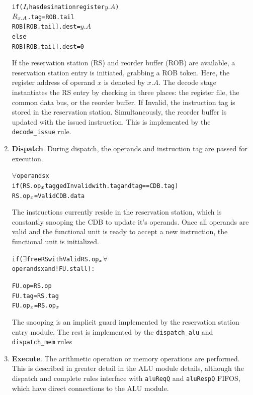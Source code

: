 \documentclass[12pt]{article}
\newcommand{\mtt}[1]{\(#1\)}
\begin{document}
\begin{enumerate}
\begin{alltt}
               if (\mtt{I\sb{i}} has desination register \mtt{y.A})
                   \mtt{R\sb{x.A}}.tag = ROB.tail
                   ROB[ROB.tail].dest = \mtt{y.A}
               else
                   ROB[ROB.tail].dest = 0
       \end{alltt}
       If the reservation station (RS) and reorder buffer (ROB) are available, a reservation station entry is 
       initiated, grabbing a ROB token. Here, the register address of operand $x$ is denoted by $x.A$. The decode 
       stage instantiates the RS entry by checking in three places: the register file, the common data bus, or the
       reorder buffer. If Invalid, the instruction tag is stored in the reservation station. Simultaneously, the 
       reorder buffer is updated with the issued instruction. This is implemented by the \verb=decode_issue= rule.
    \item \textbf{Dispatch}. During dispatch, the operands and instruction tag are passed for execution. 
        \begin{alltt}
            \mtt{\forall} operands x
                if (RS.op\mtt{\sb{x}} tagged Invalid with .tag and tag == CDB.tag)
                    RS.op\mtt{\sb{x}} = Valid CDB.data
        \end{alltt}
        The instructions currently reside in the reservation station, which is constantly snooping the 
        CDB to update it's operands. Once all operands are valid and the functional unit is ready to accept
        a new instruction, the functional unit is initialized. 
        \begin{alltt}
            if (\mtt{\exists} free RS with Valid RS.op\mtt{\sb{x}} \mtt{\forall}
                operands x and !FU.stall):
                
                FU.op = RS.op
                FU.tag = RS.tag
                FU.op\mtt{\sb{x}} = RS.op\mtt{\sb{x}}
        \end{alltt}
        The snooping is an implicit guard implemented by the reservation station entry module. The rest is 
        implemented by the \verb=dispatch_alu= and \verb=dispatch_mem= rules
        
    \item \textbf{Execute}. The arithmetic operation or memory operations are performed. This is
    described in greater detail in the ALU module details, although the dispatch and complete rules 
    interface with \verb=aluReqQ= and \verb=aluRespQ= FIFOS, which have direct connections to the ALU 
    module.
        

\end{enumerate}
\end{document}
